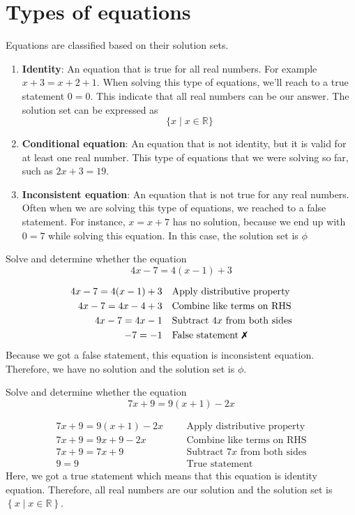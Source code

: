 \section{Types of equations}
Equations are classified based on their solution sets. 
\begin{enumerate}[label=\protect\circled{\arabic*}]
    \item \textbf{Identity}: An equation that is true for all real numbers. For example $x+3=x+2+1$. When solving this type of equations, we'll reach to a true statement $0=0$. This indicate that all real numbers can be our answer. The solution set can be expressed as \[\{x \mid x \in \mathbb{R}\} \]
    \item \textbf{Conditional equation}: An equation that is not identity, but it is valid for at least one real number. This type of equations that we were solving so far, such as $2x+3=19$.
    \item \textbf{Inconsistent equation}: An equation that is not true for any real numbers. Often when we are solving this type of equations, we reached to a false statement. For instance, $x=x+7$ has no solution, because we end up with $0=7$ while solving this equation. In this case, the solution set is $\phi$
\end{enumerate}
\begin{exa}
    Solve and determine whether the equation \[
        4x-7 = 4(x-1) + 3
    \]
\end{exa}
\begin{align*}
    4x-7 = 4(x-1) + 3&  &&\text{Apply distributive property}\\
    4x-7 = 4x-4 + 3&    &&\text{Combine like terms on RHS}\\
    4x-7 = 4x-1&    &&\text{Subtract $4x$ from both sides}\\
    -7 = -1&    &&\text{False statement\ \xmark}
\end{align*}
Because we got a false statement, this equation is inconsistent equation. Therefore, we have no solution and the solution set is $\phi$.
\begin{exa}
    Solve and determine whether the equation \[
        7x+9 = 9(x+1) -2x
    \]
\end{exa}
\begin{align*}
    7x+9 = 9(x+1) -2x&  &&\text{Apply distributive property}\\
    7x+9 = 9x+9 -2x&    &&\text{Combine like terms on RHS}\\
    7x+9 = 7x+9&    &&\text{Subtract $7x$ from both sides}\\
    9 = 9&    &&\text{True statement}
\end{align*}
Here, we got a true statement which means that this equation is identity equation. Therefore, all real numbers are our solution and the solution set is $\left\{x \mid x \in \mathbb{R} \right\} $.